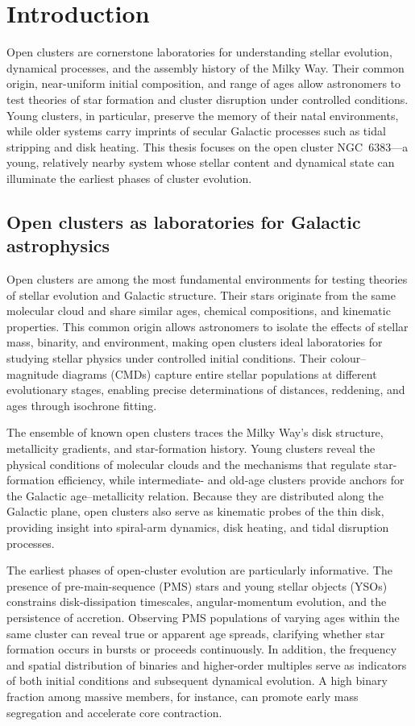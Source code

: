 \documentclass[../main.tex]{subfiles}
\begin{document}
\section{Introduction}

Open clusters are cornerstone laboratories for understanding stellar evolution, dynamical processes, and the assembly history of the Milky Way. Their common origin, near-uniform initial composition, and range of ages allow astronomers to test theories of star formation and cluster disruption under controlled conditions. Young clusters, in particular, preserve the memory of their natal environments, while older systems carry imprints of secular Galactic processes such as tidal stripping and disk heating. This thesis focuses on the open cluster NGC~6383---a young, relatively nearby system whose stellar content and dynamical state can illuminate the earliest phases of cluster evolution.

\subsection{Open clusters as laboratories for Galactic astrophysics}

Open clusters are among the most fundamental environments for testing theories of stellar evolution and Galactic structure. Their stars originate from the same molecular cloud and share similar ages, chemical compositions, and kinematic properties. This common origin allows astronomers to isolate the effects of stellar mass, binarity, and environment, making open clusters ideal laboratories for studying stellar physics under controlled initial conditions. Their colour--magnitude diagrams (CMDs) capture entire stellar populations at different evolutionary stages, enabling precise determinations of distances, reddening, and ages through isochrone fitting.

The ensemble of known open clusters traces the Milky Way’s disk structure, metallicity gradients, and star-formation history. Young clusters reveal the physical conditions of molecular clouds and the mechanisms that regulate star-formation efficiency, while intermediate- and old-age clusters provide anchors for the Galactic age--metallicity relation. Because they are distributed along the Galactic plane, open clusters also serve as kinematic probes of the thin disk, providing insight into spiral-arm dynamics, disk heating, and tidal disruption processes.

The earliest phases of open-cluster evolution are particularly informative. The presence of pre-main-sequence (PMS) stars and young stellar objects (YSOs) constrains disk-dissipation timescales, angular-momentum evolution, and the persistence of accretion. Observing PMS populations of varying ages within the same cluster can reveal true or apparent age spreads, clarifying whether star formation occurs in bursts or proceeds continuously. In addition, the frequency and spatial distribution of binaries and higher-order multiples serve as indicators of both initial conditions and subsequent dynamical evolution. A high binary fraction among massive members, for instance, can promote early mass segregation and accelerate core contraction.
\end{document}
